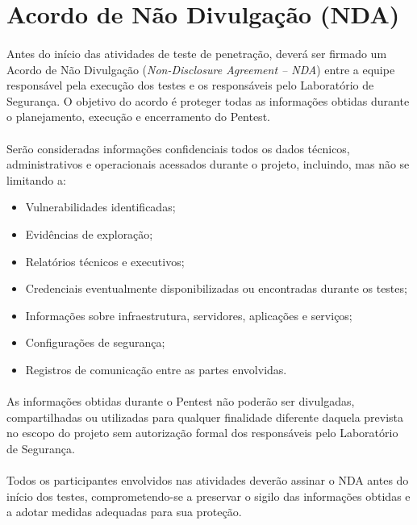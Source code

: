 \section{Acordo de Não Divulgação (NDA)}

\paragraph{}
Antes do início das atividades de teste de penetração, deverá ser firmado um
Acordo de Não Divulgação (\textit{Non-Disclosure Agreement -- NDA}) entre a
equipe responsável pela execução dos testes e os responsáveis pelo Laboratório
de Segurança. O objetivo do acordo é proteger todas as informações obtidas
durante o planejamento, execução e encerramento do Pentest.

\paragraph{}
Serão consideradas informações confidenciais todos os dados técnicos,
administrativos e operacionais acessados durante o projeto, incluindo, mas não
se limitando a:

\begin{itemize}
\item Vulnerabilidades identificadas;
\item Evidências de exploração;
\item Relatórios técnicos e executivos;
\item Credenciais eventualmente disponibilizadas ou encontradas durante os
testes;
\item Informações sobre infraestrutura, servidores, aplicações e serviços;
\item Configurações de segurança;
\item Registros de comunicação entre as partes envolvidas.
\end{itemize}

\paragraph{}
As informações obtidas durante o Pentest não poderão ser divulgadas,
compartilhadas ou utilizadas para qualquer finalidade diferente daquela
prevista no escopo do projeto sem autorização formal dos responsáveis pelo
Laboratório de Segurança.

\paragraph{}
Todos os participantes envolvidos nas atividades deverão assinar o NDA antes do
início dos testes, comprometendo-se a preservar o sigilo das informações
obtidas e a adotar medidas adequadas para sua proteção.

